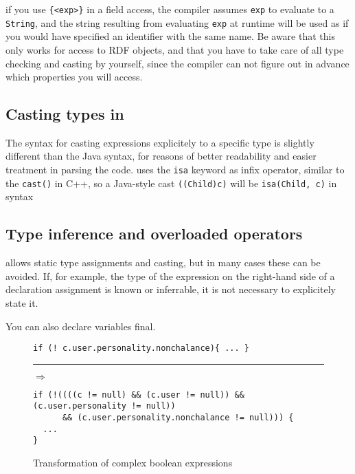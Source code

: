if you use \verb|{<exp>}| in a field access, the compiler assumes
\texttt{exp} to evaluate to a \texttt{String}, and the string
resulting from evaluating \texttt{exp} at runtime will be used as if
you would have specified an identifier with the same name. Be aware
that this only works for access to RDF objects, and that you have to
take care of all type checking and casting by yourself, since the
compiler can not figure out in advance which properties you will access.

\subsection{Casting types in \vonda}
\label{sec:cast}

The syntax for casting expressions explicitely to a specific type is
slightly different than the Java syntax, for reasons of better
readability and easier treatment in parsing the code. \vonda uses the
\texttt{isa} keyword as infix operator, similar to the \texttt{cast()}
in C++, so a Java-style cast \texttt{((Child)c)} will be
\texttt{isa(Child, c)} in \vonda syntax

\subsection{Type inference and overloaded operators}
\label{sec:typeinference}

\vonda allows static type assignments and casting, but in many cases these can
be avoided. If, for example, the type of the expression on the right-hand side
of a declaration assignment is known or inferrable, it is not necessary to
explicitely state it.

You can also declare variables final.

\begin{figure}[htbp]
  \begin{small}
\begin{minipage}{.55\textwidth}
\begin{lstlisting}
if (! c.user.personality.nonchalance){ ... }
\end{lstlisting}
\end{minipage}\rule{2cm}{0pt}{\LARGE$\Rightarrow$}\hfill\\
\begin{lstlisting}
if (!((((c != null) && (c.user != null)) && (c.user.personality != null))
      && (c.user.personality.nonchalance != null))) {
  ...
}
\end{lstlisting}\end{small}\vspace*{-2ex}
\caption{\label{tab:multi-predaccess}Transformation of complex boolean expressions}

\end{figure}
\vspace*{10pt}

